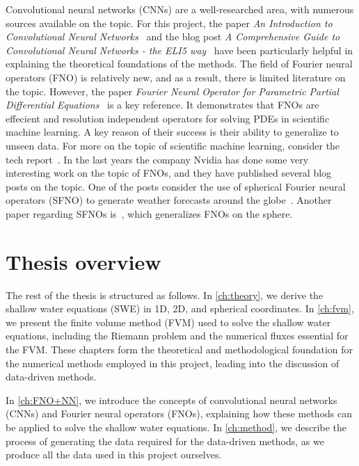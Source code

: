 Convolutional neural networks (CNNs) are a well-researched area, with numerous sources available on the topic.
For this project, the paper \textit{An Introduction to Convolutional Neural Networks}~\cite{oshea2015introductionconvolutionalneuralnetworks} and the blog post \textit{A Comprehensive Guide to Convolutional Neural Networks - the ELI5 way}~\cite{chollet2017comprehensive} have been particularly helpful in explaining the theoretical foundations of the methods.
The field of Fourier neural operators (FNO) is relatively new, and as a result, there is limited literature on the topic.
However, the paper \textit{Fourier Neural Operator for Parametric Partial Differential Equations}~\cite{FNO_2021} is a key reference.
It demonstrates that FNOs are effecient and resolution independent operators for solving PDEs in scientific machine learning.
A key reason of their success is their ability to generalize to unseen data.
For more on the topic of scientific machine learning, consider the tech report~\cite{osti_1478744}.
In the last years the company Nvidia has done some very interesting work on the topic of FNOs, and they have published several blog posts on the topic.
One of the posts consider the use of spherical Fourier neural operators (SFNO) to generate weather forecasts around the globe~\cite{Nvidia2023}.
Another paper regarding SFNOs is~\cite{bonev2023-SFNO}, which generalizes FNOs on the sphere.

\newpage
\section{Thesis overview}
The rest of the thesis is structured as follows.
In \autoref{ch:theory}, we derive the shallow water equations (SWE) in 1D, 2D, and spherical coordinates.
In \autoref{ch:fvm}, we present the finite volume method (FVM) used to solve the shallow water equations, including the Riemann problem and the numerical fluxes essential for the FVM.
These chapters form the theoretical and methodological foundation for the numerical methods employed in this project, leading into the discussion of data-driven methods.

In \autoref{ch:FNO+NN}, we introduce the concepts of convolutional neural networks (CNNs) and Fourier neural operators (FNOs), explaining how these methods can be applied to solve the shallow water equations.
In \autoref{ch:method}, we describe the process of generating the data required for the data-driven methods, as we produce all the data used in this project ourselves.

